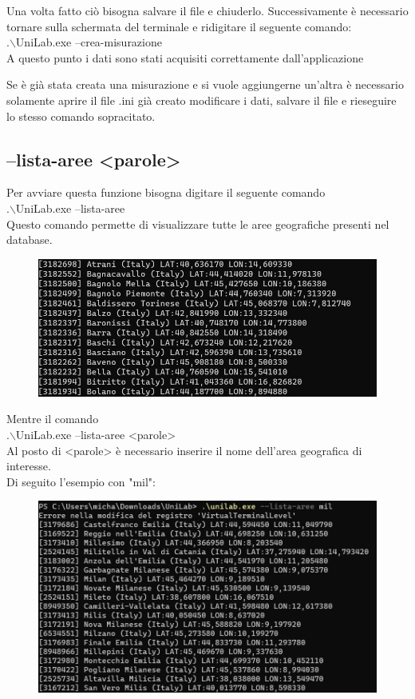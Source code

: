 \documentclass[12pt]{scrreprt}
\begin{document}
		
		Una volta fatto ciò bisogna salvare il file e chiuderlo.
		Successivamente è necessario tornare sulla schermata del terminale e ridigitare il seguente comando:
		\\.$\backslash$UniLab.exe --crea-misurazione\\
		
		A questo punto i dati sono stati acquisiti correttamente dall'applicazione
		
		Se è già stata creata una misurazione e si vuole aggiungerne un'altra è necessario solamente aprire il file .ini già creato modificare i dati, salvare il file e rieseguire lo stesso comando sopracitato.
		
		
		\subsection{--lista-aree <parole>}
		Per avviare questa funzione bisogna digitare il seguente comando
		\\.$\backslash$UniLab.exe --lista-aree\\
		Questo comando permette di visualizzare tutte le aree geografiche presenti nel database.
		
		\begin{figure}[H]
			\centering
			\includegraphics[width=0.9\linewidth]{Screen/listaaree}
			\caption[Schermata principale]{}
			\label{fig:listaaree}
		\end{figure}
		
		Mentre il comando
		\\.$\backslash$UniLab.exe --lista-aree <parole>\\
		Al posto di <parole>  è necessario inserire il nome dell'area geografica di interesse.
		\\Di seguito l'esempio con "mil":
		\begin{figure}[H]
			\centering
			\includegraphics[width=0.9\linewidth]{Screen/listaareemil}
			\caption[Schermata principale]{}
			\label{fig:listaareemil}
		\end{figure}
		 
\end{document}
